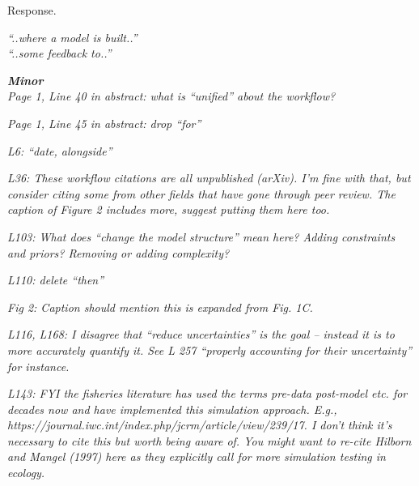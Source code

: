 \documentclass[11pt,letter]{article}
\begin{document}
Response.

\begin{mybox}
\emph{“..where a model is built..”\\
“..some feedback to..”}
\end{mybox}

\begin{mybox}
\emph{\textbf{Minor}\\
Page 1, Line 40 in abstract: what is “unified” about the workflow?}
\end{mybox}

\begin{mybox}
\emph{Page 1, Line 45 in abstract: drop “for”}
\end{mybox}

\begin{mybox}
\emph{L6: “date, alongside”}
\end{mybox}

\begin{mybox}
\emph{L36: These workflow citations are all unpublished (arXiv). I’m fine with that, but consider citing some from other fields that have gone through peer review. The caption of Figure 2 includes more, suggest putting them here too.}
\end{mybox}

\begin{mybox}
\emph{L103: What does “change the model structure” mean here? Adding constraints and priors? Removing or adding complexity?}
\end{mybox}

\begin{mybox}
\emph{L110: delete “then”}
\end{mybox}

\begin{mybox}
\emph{Fig 2: Caption should mention this is expanded from Fig. 1C.}
\end{mybox}

\begin{mybox}
\emph{L116, L168: I disagree that “reduce uncertainties” is the goal – instead it is to more accurately quantify it. See L 257 “properly accounting for their uncertainty” for instance.}
\end{mybox}

\begin{mybox}
\emph{L143: FYI the fisheries literature has used the terms pre-data post-model etc. for decades now and have implemented this simulation approach. E.g., https://journal.iwc.int/index.php/jcrm/article/view/239/17. I don’t think it’s necessary to cite this but worth being aware of. You might want to re-cite Hilborn and Mangel (1997) here as they explicitly call for more simulation testing in ecology.}
\end{mybox}
\end{document}
